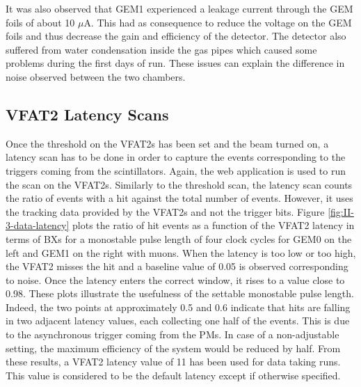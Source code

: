       It was also observed that GEM1 experienced a leakage current through the GEM foils of about 10 $\mu$A. This had as consequence to reduce the voltage on the GEM foils and thus decrease the gain and efficiency of the detector. The detector also suffered from water condensation inside the gas pipes which caused some problems during the first days of run. These issues can explain the difference in noise observed between the two chambers.

    \subsection{VFAT2 Latency Scans}

      Once the threshold on the VFAT2s has been set and the beam turned on, a latency scan has to be done in order to capture the events corresponding to the triggers coming from the scintillators. Again, the web application is used to run the scan on the VFAT2s. Similarly to the threshold scan, the latency scan counts the ratio of events with a hit against the total number of events. However, it uses the tracking data provided by the VFAT2s and not the trigger bits. Figure \ref{fig:II-3-data-latency} plots the ratio of hit events as a function of the VFAT2 latency in terms of BXs for a monostable pulse length of four clock cycles for GEM0 on the left and GEM1 on the right with muons. When the latency is too low or too high, the VFAT2 misses the hit and a baseline value of 0.05 is observed corresponding to noise. Once the latency enters the correct window, it rises to a value close to 0.98. These plots illustrate the usefulness of the settable monostable pulse length. Indeed, the two points at approximately 0.5 and 0.6 indicate that hits are falling in two adjacent latency values, each collecting one half of the events. This is due to the asynchronous trigger coming from the PMs. In case of a non-adjustable setting, the maximum efficiency of the system would be reduced by half. From these results, a VFAT2 latency value of 11 has been used for data taking runs. This value is considered to be the default latency except if otherwise specified. \\

